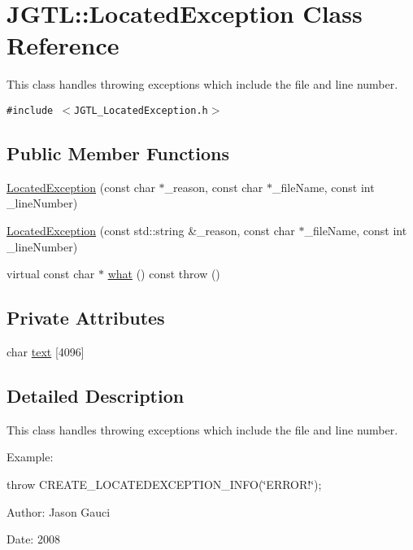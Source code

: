 \hypertarget{class_j_g_t_l_1_1_located_exception}{
\section{JGTL::Located\-Exception Class Reference}
\label{class_j_g_t_l_1_1_located_exception}
}
This class handles throwing exceptions which include the file and line number.  


{\tt \#include $<$JGTL\_\-Located\-Exception.h$>$}

\subsection*{Public Member Functions}
\begin{CompactItemize}
\item 
\hyperlink{class_j_g_t_l_1_1_located_exception_6dc12a4d8a6e75095fd87a45c2cfc54e}{Located\-Exception} (const char $\ast$\_\-reason, const char $\ast$\_\-file\-Name, const int \_\-line\-Number)
\item 
\hyperlink{class_j_g_t_l_1_1_located_exception_3204e4c6770b4f61dc063aa0e440dd9a}{Located\-Exception} (const std::string \&\_\-reason, const char $\ast$\_\-file\-Name, const int \_\-line\-Number)
\item 
virtual const char $\ast$ \hyperlink{class_j_g_t_l_1_1_located_exception_563583a831452b2e4a522ba943f8b6ed}{what} () const  throw ()
\end{CompactItemize}
\subsection*{Private Attributes}
\begin{CompactItemize}
\item 
char \hyperlink{class_j_g_t_l_1_1_located_exception_db8c3af227f50afffa775e69fe82b096}{text} \mbox{[}4096\mbox{]}
\end{CompactItemize}


\subsection{Detailed Description}
This class handles throwing exceptions which include the file and line number. 

Example:

throw CREATE\_\-LOCATEDEXCEPTION\_\-INFO(\char`\"{}ERROR!\char`\"{});

\begin{Desc}
\item[Author:]Jason Gauci \end{Desc}
\begin{Desc}
\item[Date:]2008 \end{Desc}




